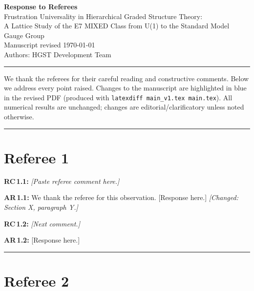 \documentclass[12pt,a4paper]{article}
\newcommand{\RC}[2]{\noindent\begin{reviewerbox}\textbf{\textcolor{reviewergray}{RC\,#1.#2:}}}
\newcommand{\RCend}{\end{reviewerbox}}
\newcommand{\AR}[2]{\noindent\begin{authorbox}\textbf{\textcolor{authorblue}{AR\,#1.#2:}}}
\newcommand{\ARend}{\end{authorbox}}
\newcommand{\changed}[1]{\textcolor{changedgreen}{\textit{[Changed: #1]}}}
\begin{document}

\begin{center}
  {\Large\bfseries Response to Referees}\\[8pt]
  {\large Frustration Universality in Hierarchical Graded Structure Theory:\\
  A Lattice Study of the E7 MIXED Class from U(1) to the Standard Model Gauge Group}\\[6pt]
  Manuscript revised \today \\[4pt]
  {\small Authors: HGST Development Team}
\end{center}

\bigskip
\noindent\rule{\linewidth}{0.8pt}

\noindent
We thank the referees for their careful reading and constructive comments.
Below we address every point raised.
Changes to the manuscript are highlighted in blue in the revised PDF
(produced with \texttt{latexdiff main\_v1.tex main.tex}).
All numerical results are unchanged; changes are editorial/clarificatory
unless noted otherwise.

\bigskip
\noindent\rule{\linewidth}{0.4pt}

\section*{Referee 1}


\RC{1}{1}
  \textit{[Paste referee comment here.]}
\RCend

\AR{1}{1}
  We thank the referee for this observation. [Response here.]
  \changed{Section X, paragraph Y.}
\ARend

\RC{1}{2}
  \textit{[Next comment.]}
\RCend

\AR{1}{2}
  [Response here.]
\ARend


\bigskip
\noindent\rule{\linewidth}{0.4pt}

\section*{Referee 2}
\end{document}

